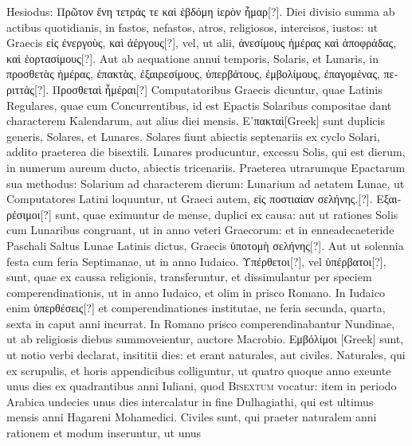 Hesiodus: \textgreek{Πρῶτον ἔνη τετράς τε καὶ ἑβδόμη ἰερὸν ἦμαρ[?]}.
Diei divisio summa ab actibus quotidianis, in fastos, nefastos, atros,
religiosos, intercisos, iustos: ut Graecis
 \textgreek{εἰς ἐνεργοὺς, καὶ ἀέργους[?]}, vel, ut alii,
\textgreek{ἀνεσίμους ἡμέρας καὶ ἀποφράδας, καὶ ἑορτασίμους[?]}.
Aut ab aequatione annui
temporis, Solaris, et Lunaris, in
 \textgreek{προσθετὰς ἡμέρας, ἐπακτὰς, ἐξαιρεσίμους,
ὑπερβάτους, ἐμβολίμους, ἐπαγομένας, περιττάς[?]}.
\textgreek{Προσθεταὶ ἧμέραι[?]} Computatoribus
Graecis dicuntur, quae Latinis Regulares, quae cum Concurrentibus,
id est Epactis Solaribus compositae dant characterem Kalendarum,
aut alius diei mensis.
\textgreek{Ε᾽πακταὶ[Greek]} sunt duplicis generis, Solares, et
Lunares.
Solares fiunt abiectis septenariis ex cyclo Solari, addito praeterea
die bisextili.
Lunares producuntur, excessu Solis, qui est  dierum,
in numerum aureum ducto, abiectis tricenariis.
Praeterea utrarumque
Epactarum sua methodus: Solarium ad characterem dierum:
Lunarium ad aetatem Lunae, ut Computatores Latini loquuntur, ut
Graeci autem, \textgreek{εἰς ποστιαίαν σελήνης.[?]}.
%
\textgreek{Εξαιρέσιμοι[?]} sunt, quae eximuntur de
mense, duplici ex causa: aut ut rationes Solis cum Lunaribus congruant,
ut in anno veteri Graecorum: et in enneadecaeteride Paschali
Saltus Lunae Latinis dictus, Graecis \textgreek{ὑποτομὴ σελήνης[?]}.
Aut ut solennia
festa cum feria Septimanae, ut in anno Iudaico.
\textgreek{Υπέρθετοι[?]}, vel \textgreek{ὑπέρβατοι[?]},
sunt, quae ex caussa religionis, transferuntur, et dissimulantur per speciem
comperendinationis, ut in anno Iudaico, et olim in prisco Romano.
In Iudaico enim \textgreek{ὑπερθέσεις[?]} et comperendinationes
 institutae, ne
feria secunda, quarta, sexta in caput anni incurrat.
In Romano prisco
comperendinabantur Nundinae, ut ab religiosis diebus summoveientur,
auctore Macrobio.
\textgreek{Εμβόλίμοι [Greek]} sunt, ut notio verbi declarat, insititii
dies: et erant naturales, aut civiles.
Naturales, qui ex scrupulis, et
horis appendicibus colliguntur, ut quatro quoque anno exeunte unus
dies ex quadrantibus anni Iuliani, quod \textsc{Bisextum} vocatur: item
in periodo Arabica undecies unus dies intercalatur in fine Dulhagiathi,
qui est ultimus mensis anni Hagareni Mohamedici.
Civiles sunt,
qui praeter naturalem anni rationem et modum inseruntur, ut unus
